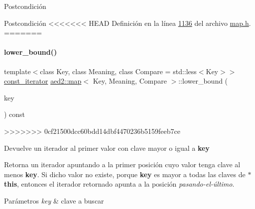 \begin{DoxyPostcond}{\-Postcondición}
\begin{DoxyPostcond}{\-Postcondición}
<<<<<<< HEAD
\-Definición en la línea \hyperlink{map_8h_source_l01136}{1136} del archivo \hyperlink{map_8h_source}{map.\-h}.
=======
\mbox{\label{classaed2_1_1map_a62075a47afdf89267c5462f88164af3d_a62075a47afdf89267c5462f88164af3d}} 
\paragraph{\texorpdfstring{lower\+\_\+bound()}{lower\_bound()}\hspace{0.1cm}{\footnotesize\ttfamily [1/2]}}
{\footnotesize\ttfamily template$<$class Key, class Meaning, class Compare = std\+::less$<$\+Key$>$$>$ \\
\hyperlink{classaed2_1_1map_1_1const__iterator}{const\+\_\+iterator} \hyperlink{classaed2_1_1map}{aed2\+::map}$<$ Key, Meaning, Compare $>$\+::lower\+\_\+bound (\begin{DoxyParamCaption}\item[{const Key \&}]{key }\end{DoxyParamCaption}) const\hspace{0.3cm}{\ttfamily [inline]}}
>>>>>>> 0cf21500dcc60bdd14dbf4470236b5159feeb7ce



Devuelve un iterador al primer valor con clave mayor o igual a {\bfseries key} 

Retorna un iterador apuntando a la primer posición cuyo valor tenga clave al menos {\bfseries key}. Si dicho valor no existe, porque {\bfseries key} es mayor a todas las claves de {\bfseries $\ast$this}, entonces el iterador retornado apunta a la posición {\itshape pasando-\/el-\/último}.


\begin{DoxyParams}{Parámetros}
{\em key} & clave a buscar \\
\hline
\end{DoxyParams}


\end{DoxyPostcond}
\end{DoxyPostcond}
